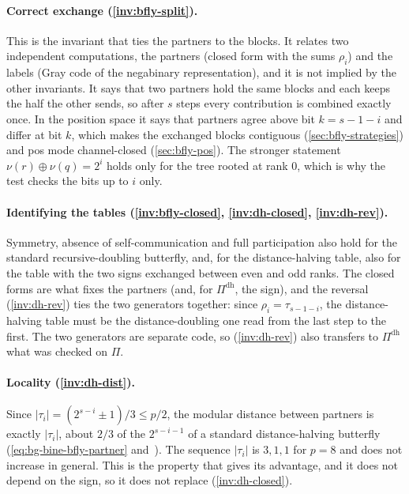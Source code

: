 \paragraph{Correct exchange (\ref{inv:bfly-split}).}
This is the invariant that ties the partners to the blocks.
It relates two independent computations, the partners (closed form with the sums $\rho_i$) and the labels (Gray code of the negabinary representation), and it is not implied by the other invariants.
It says that two partners hold the same blocks and each keeps the half the other sends, so after $s$ steps every contribution is combined exactly once.
In the position space it says that partners agree above bit $k=s-1-i$ and differ at bit $k$, which makes the exchanged blocks contiguous (\cref{sec:bfly-strategies}) and pos mode channel-closed (\cref{sec:bfly-pos}).
The stronger statement $\nu(r)\oplus\nu(q)=2^i$ holds only for the tree rooted at rank $0$, which is why the test checks the bits up to $i$ only.

\paragraph{Identifying the tables (\ref{inv:bfly-closed}, \ref{inv:dh-closed}, \ref{inv:dh-rev}).}
Symmetry, absence of self-communication and full participation also hold for the standard recursive-doubling butterfly, and, for the distance-halving table, also for the table with the two signs exchanged between even and odd ranks.
The closed forms are what fixes the partners (and, for $\Pi^{\mathrm{dh}}$, the sign), and the reversal (\ref{inv:dh-rev}) ties the two generators together: since $\rho_i=\tau_{s-1-i}$, the distance-halving table must be the distance-doubling one read from the last step to the first.
The two generators are separate code, so (\ref{inv:dh-rev}) also transfers to $\Pi^{\mathrm{dh}}$ what was checked on $\Pi$.

\paragraph{Locality (\ref{inv:dh-dist}).}
Since $\lvert\tau_i\rvert=(2^{s-i}\pm1)/3\le p/2$, the modular distance between partners is exactly $\lvert\tau_i\rvert$, about $2/3$ of the $2^{s-i-1}$ of a standard distance-halving butterfly (\cref{eq:bg-bine-bfly-partner} and~\cite{desensi2025bine}).
The sequence $\lvert\tau_i\rvert$ is $3,1,1$ for $p=8$ and does not increase in general.
This is the property that gives \bine{} its advantage, and it does not depend on the sign, so it does not replace (\ref{inv:dh-closed}).

